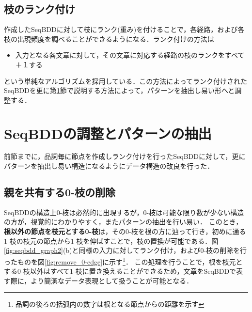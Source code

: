 \documentclass[12pt,twoside, fleqn]{ujbook}
\begin{document}
	\subsection{枝のランク付け}
	\label{text:rank_edge}
	作成したSeqBDDに対して枝にランク(重み)を付けることで，各経路，および各枝の出現頻度を調べることができるようになる．ランク付けの方法は
	\begin{itemize}
		\item 入力となる各文章に対して，その文章に対応する経路の枝のランクをすべて＋１する
	\end{itemize}
	という単純なアルゴリズムを採用している．この方法によってランク付けされたSeqBDDを更に第\ref{text:seq_arrange}節で説明する方法によって，パターンを抽出し易い形へと調整する．\\

%
\newpage
\section{SeqBDDの調整とパターンの抽出}
\label{text:seq_arrange}
前節までに，品詞毎に節点を作成しランク付けを行ったSeqBDDに対して，更にパターンを抽出し易い構造になるようにデータ構造の改良を行った．

	\subsection{親を共有する0-枝の削除}
	SeqBDDの構造上0-枝は必然的に出現するが，0-枝は可能な限り数が少ない構造の方が，視覚的にわかりやすく，またパターンの抽出を行い易い．
	このとき，{\bf 根以外の節点を枝元とする0-枝}は，その0-枝を根の方に辿って行き，初めに通る1-枝の枝元の節点から1-枝を伸ばすことで，枝の置換が可能である．図\ref{fig:seqbdd_graph2}(b)と同様の入力に対してランク付け，および0-枝の削除を行ったものを図\ref{fig:remove_0-edge}に示す\footnote{品詞の後ろの括弧内の数字は根となる節点からの距離を示す}．
	この処理を行うことで，根を枝元とする0-枝以外はすべて1-枝に置き換えることができるため，文章をSeqBDDで表す際に，より簡潔なデータ表現として扱うことが可能となる．
\end{document}
